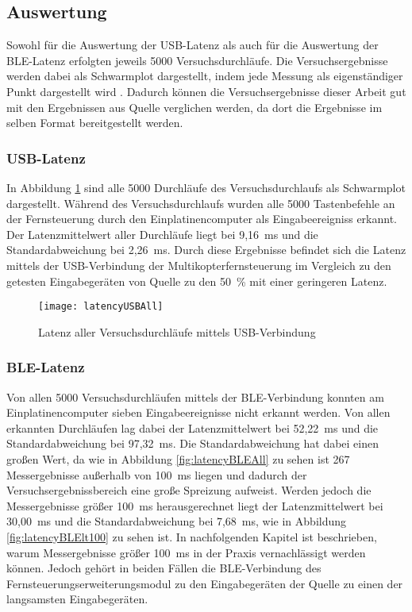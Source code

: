 \subsection{Auswertung}
Sowohl für die Auswertung der USB-Latenz als auch für die Auswertung der \ac{BLE}-Latenz erfolgten jeweils 5000 Versuchsdurchläufe. Die Versuchsergebnisse werden dabei als Schwarmplot dargestellt, indem jede Messung als eigenständiger Punkt dargestellt wird \cite[S.~7]{wimmerLatenzStation}. Dadurch können die Versuchsergebnisse dieser Arbeit gut mit den Ergebnissen aus Quelle \cite{wimmerLatenzStation} verglichen werden, da dort die Ergebnisse im selben Format bereitgestellt werden. 

\subsubsection{USB-Latenz}
In Abbildung \ref{fig:latencyUSBAll} sind alle 5000 Durchläufe des Versuchsdurchlaufs als Schwarmplot dargestellt. Während des Versuchsdurchlaufs wurden alle 5000 Tastenbefehle an der Fernsteuerung durch den Einplatinencomputer als Eingabeereigniss erkannt. Der Latenzmittelwert aller Durchläufe liegt bei 9,16~ms und die Standardabweichung bei 2,26~ms. Durch diese Ergebnisse befindet sich die Latenz mittels der USB-Verbindung der Multikopterfernsteuerung im Vergleich zu den getesten Eingabegeräten von Quelle \cite{wimmerLatenzStation} zu den 50~\% mit einer geringeren Latenz.

\begin{figure}[H]
    \centering
    \texttt{[image: latencyUSBAll]}
    \caption{Latenz aller Versuchsdurchläufe mittels USB-Verbindung}
    \label{fig:latencyUSBAll}
\end{figure}

\subsubsection{\ac{BLE}-Latenz}
Von allen 5000 Versuchsdurchläufen mittels der \ac{BLE}-Verbindung konnten am Einplatinencomputer sieben Eingabeereignisse nicht erkannt werden. Von allen erkannten Durchläufen lag dabei der Latenzmittelwert bei 52,22~ms und die Standardabweichung bei 97,32~ms. Die Standardabweichung hat dabei einen großen Wert, da wie in Abbildung \ref{fig:latencyBLEAll} zu sehen ist 267 Messergebnisse außerhalb von 100~ms liegen und dadurch der Versuchsergebnissbereich eine große Spreizung aufweist. Werden jedoch die Messergebnisse größer 100~ms herausgerechnet liegt der Latenzmittelwert bei 30,00~ms und die Standardabweichung bei 7,68~ms, wie in Abbildung \ref{fig:latencyBLElt100} zu sehen ist. In nachfolgenden Kapitel ist beschrieben, warum Messergebnisse größer 100~ms in der Praxis vernachlässigt werden können. Jedoch gehört in beiden Fällen die \ac{BLE}-Verbindung des Fernsteuerungserweiterungsmodul zu den Eingabegeräten der Quelle \cite{wimmerLatenzStation} zu einen der langsamsten Eingabegeräten.

